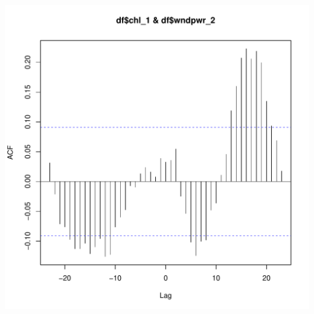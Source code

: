 \documentclass{article}\usepackage[]{graphicx}\usepackage[]{color}
\makeatletter
\def\maxwidth{ %
  \ifdim\Gin@nat@width>\linewidth
    \linewidth
  \else
    \Gin@nat@width
  \fi
}
\newenvironment{knitrout}{}{} %
\makeatother
\begin{document}
\begin{knitrout}
\includegraphics[width=\maxwidth]{figure/unnamed-chunk-28-2} 

\end{knitrout}
\end{document}
